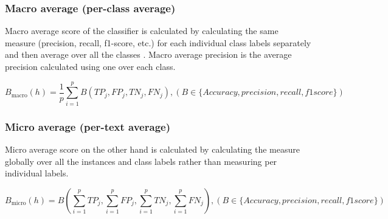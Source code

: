 \subsubsection{Macro average (per-class average)}
Macro average score of the classifier is calculated by calculating the same measure (precision, recall, f1-score, etc.) for each individual class labels separately and then average over all the classes \cite{sorower2010literature}. Macro average precision is the average precision calculated using one over each class. 

$$B_\mathrm{macro}(h) = \frac{1}{p}\sum_{i =1}^{p}B(TP_j,FP_j,TN_j,FN_j), (B\in \{Accuracy,precision,recall,f1score\})$$ \cite{zhang2010multi}



\subsubsection{Micro average (per-text average)}
Micro average score on the other hand is calculated by calculating the measure globally over all the instances and class labels rather than measuring per individual labels.\cite{zhang2010multi}

$$B_\mathrm{micro}(h) = B\left(\sum_{i =1}^{p}TP_j,\sum_{i =1}^{p}FP_j,\sum_{i =1}^{p}TN_j,\sum_{i =1}^{p}FN_j\right), (B\in \{Accuracy,precision,recall,f1score\})$$ \cite{zhang2010multi}
